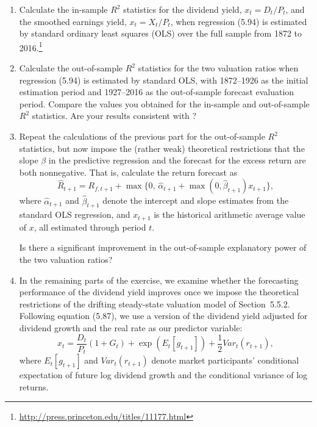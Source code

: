 \documentclass[12pt]{article}
\begin{document}
\begin{enumerate}[label=\textbf{(\alph*)}]

    \item Calculate the in-sample $R^2$ statistics for the dividend yield, $x_t = D_t / P_t$, and the smoothed earnings yield, $x_t = X_t / P_t$, when regression (5.94) is estimated by standard ordinary least squares (OLS) over the full sample from 1872 to 2016.\footnote{\url{http://press.princeton.edu/titles/11177.html}}

    \item Calculate the out-of-sample $R^2$ statistics for the two valuation ratios when regression (5.94) is estimated by standard OLS, with 1872–1926 as the initial estimation period and 1927–2016 as the out-of-sample forecast evaluation period. Compare the values you obtained for the in-sample and out-of-sample $R^2$ statistics. Are your results consistent with \textcite{WelchGoyal2008}?

    \item Repeat the calculations of the previous part for the out-of-sample $R^2$ statistics, but now impose the (rather weak) theoretical restrictions that the slope $\beta$ in the predictive regression and the forecast for the excess return are both nonnegative. That is, calculate the return forecast as
    \begin{equation}
        \hat{R}_{t+1} = R_{f,t+1} + \max\{0,\, \hat{\alpha}_{t+1} + \max(0, \hat{\beta}_{t+1})x_{t+1}\},
        \label{eq:5.96}
    \end{equation}
    where $\hat{\alpha}_{t+1}$ and $\hat{\beta}_{t+1}$ denote the intercept and slope estimates from the standard OLS regression, and $x_{t+1}$ is the historical arithmetic average value of $x$, all estimated through period $t$. 

    Is there a significant improvement in the out-of-sample explanatory power of the two valuation ratios?

    \item In the remaining parts of the exercise, we examine whether the forecasting performance of the dividend yield improves once we impose the theoretical restrictions of the drifting steady-state valuation model of Section~5.5.2. Following equation (5.87), we use a version of the dividend yield adjusted for dividend growth and the real rate as our predictor variable:
    \begin{equation}
        x_t = \frac{D_t}{P_t}(1 + G_t) + \exp(E_t[g_{t+1}]) + \frac{1}{2}Var_t(r_{t+1}),
        \label{eq:5.97}
    \end{equation}
    where $E_t[g_{t+1}]$ and $Var_t(r_{t+1})$ denote market participants’ conditional expectation of future log dividend growth and the conditional variance of log returns.


\end{enumerate}
\end{document}
